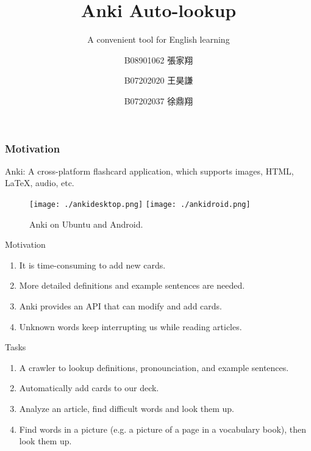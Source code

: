 \documentclass{beamer}
\title{Anki Auto-lookup}
\subtitle{A convenient tool for English learning}
\author[張家翔, 王昊謙, 徐鼎翔]
{B08901062 張家翔\inst{1} \and 
B07202020 王昊謙\inst{2} \and 
B07202037 徐鼎翔 \inst{2}}
\institute[NTU] %
{
	\inst{1}%
	Department of Electrical Engineering\\
	National Taiwan University
	\and
	\inst{2}%
	Department of Physics\\
	National Taiwan University
}
\begin{document}
\frame{\titlepage} 

\begin{frame}
	\frametitle{Motivation}
	Anki: A cross-platform flashcard application, which supports images, HTML,
	\LaTeX, audio, etc.
	\begin{figure}[h]
		\centering
		\texttt{[image: ./ankidesktop.png]}
		\texttt{[image: ./ankidroid.png]}
		\caption{Anki on Ubuntu and Android.
		\label{fig:anki}}
	\end{figure}
\end{frame}

\begin{frame}{Motivation}
	\begin{enumerate}
		\item It is time-consuming to add new cards.
		\item More detailed definitions and example sentences are needed.
		\item Anki provides an API that can modify and add cards.
		\item Unknown words keep interrupting us while reading articles.
	\end{enumerate}
\end{frame}

\begin{frame}{Tasks}
	\begin{enumerate}
		\item A crawler to lookup definitions, pronounciation, and example
			sentences.
		\item Automatically add cards to our deck.
		\item Analyze an article, find difficult words and look them up.
		\item Find words in a picture (e.g. a picture of a page in a vocabulary
			book), then look them up.
	\end{enumerate}
	
\end{frame}
\end{document}
